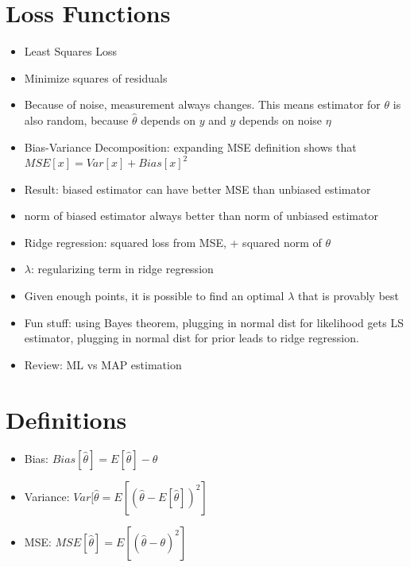 \documentclass[12pt, letter]{article}
\begin{document}
\section{Loss Functions}%
\begin{itemize}
	 \item Least Squares Loss
	 \item Minimize squares of residuals
	 \item Because of noise, measurement always changes. This means estimator for $\theta$ is also random, because $\hat{\theta}$ depends on $y$ and $y$ depends on noise $\eta$ 
	 \item Bias-Variance Decomposition: expanding MSE definition shows that $MSE[x]=Var[x]+Bias[x]^2$
	 \item Result: biased estimator can have better MSE than unbiased estimator
	 \item norm of biased estimator always better than norm of unbiased estimator
	 \item Ridge regression: squared loss from MSE, + squared norm of $\theta$
	 \item $\lambda$: regularizing term in ridge regression
	 \item Given enough points, it is possible to find an optimal $\lambda$ that is provably best
	 \item Fun stuff: using Bayes theorem, plugging in normal dist for likelihood gets LS estimator, plugging in normal dist for prior leads to ridge regression.
	 \item Review: ML vs MAP estimation
\end{itemize}

\section{Definitions}%
\label{sec:definitions}
\begin{itemize}
	 \item Bias: $Bias[\hat{\theta}] = E[\hat{\theta}]-\theta$ 
	 \item Variance: $Var[\hat{\theta} = E[(\hat{\theta} - E[\hat{\theta}])^2]$
	 \item MSE: $MSE[\hat{\theta}] = E[(\hat{\theta}-\theta)^2]$
\end{itemize}
\end{document}
